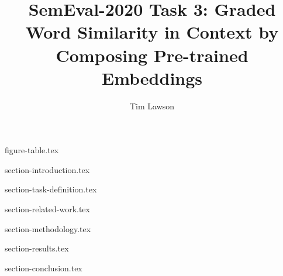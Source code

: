 \documentclass[11pt]{article}
\begin{document}
\title{SemEval-2020 Task 3: Graded Word Similarity in Context by Composing Pre-trained Embeddings}
\author[]{Tim Lawson}
\date{}

\maketitle

{figure-table.tex}

{section-introduction.tex}

{section-task-definition.tex}

{section-related-work.tex}

{section-methodology.tex}

{section-results.tex}

{section-conclusion.tex}

\printbibliography
\end{document}
